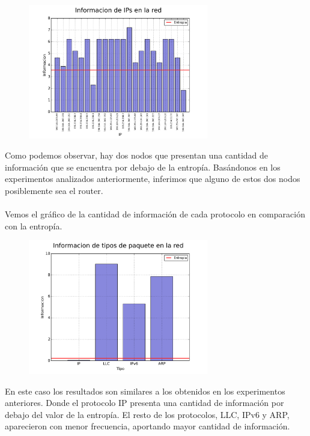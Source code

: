 \begin{figure}[ht!]
  \centering
   \includegraphics[width=0.7\textwidth]{graficos/shopping_information_bars_arp.png}
  \caption{}
  \label{fig:shopping_information_bars_arp}
\end{figure}

Como podemos observar, hay dos nodos que presentan una cantidad de información que se encuentra por debajo de la entropía. Basándonos en los experimentos analizados anteriormente, inferimos que alguno de estos dos nodos posiblemente sea el router.
\\\\
Vemos el gráfico de la cantidad de información de cada protocolo en comparación con la entropía.

\begin{figure}[ht!]
  \centering
   \includegraphics[width=0.7\textwidth]{graficos/shopping_information_bars_type.png}
  \caption{}
  \label{fig:shopping_information_bars_type}
\end{figure}

En este caso los resultados son similares a los obtenidos en los experimentos anteriores. Donde el protocolo IP presenta una cantidad de información por debajo del valor de la entropía. El resto de los protocolos, LLC, IPv6 y ARP, aparecieron con menor frecuencia, aportando mayor cantidad de información.